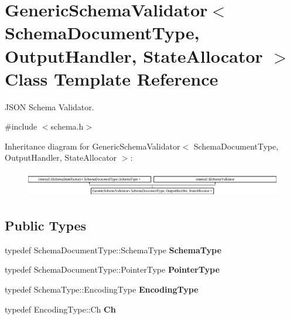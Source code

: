 \hypertarget{a00126}{}\section{Generic\+Schema\+Validator$<$ Schema\+Document\+Type, Output\+Handler, State\+Allocator $>$ Class Template Reference}
\label{a00126}


J\+S\+ON Schema Validator.  




{\ttfamily \#include $<$schema.\+h$>$}

Inheritance diagram for Generic\+Schema\+Validator$<$ Schema\+Document\+Type, Output\+Handler, State\+Allocator $>$\+:\begin{figure}[H]
\begin{center}
\leavevmode
\includegraphics[height=1.135903cm]{a00126}
\end{center}
\end{figure}
\subsection*{Public Types}
\begin{DoxyCompactItemize}
\item 
typedef Schema\+Document\+Type\+::\+Schema\+Type {\bfseries Schema\+Type}\hypertarget{a00126_ac79628f00f6720bbabb70b44f0d076a0}{}\label{a00126_ac79628f00f6720bbabb70b44f0d076a0}

\item 
typedef Schema\+Document\+Type\+::\+Pointer\+Type {\bfseries Pointer\+Type}\hypertarget{a00126_ae0c6c9a9c0ff6bae80e75c6705f2668b}{}\label{a00126_ae0c6c9a9c0ff6bae80e75c6705f2668b}

\item 
typedef Schema\+Type\+::\+Encoding\+Type {\bfseries Encoding\+Type}\hypertarget{a00126_acf1c5361bb96da87d23167d8720b1ea5}{}\label{a00126_acf1c5361bb96da87d23167d8720b1ea5}

\item 
typedef Encoding\+Type\+::\+Ch {\bfseries Ch}\hypertarget{a00126_a8b7dab5a0cda9cc0adaefb4401d260c1}{}\label{a00126_a8b7dab5a0cda9cc0adaefb4401d260c1}

\end{DoxyCompactItemize}
